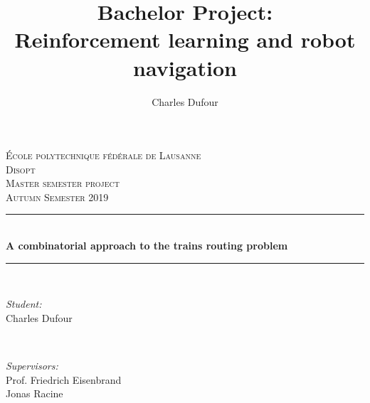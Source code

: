 \documentclass[14pt,a4paper]{article}
\author{Charles Dufour}
\title{Bachelor Project: \\
Reinforcement learning and robot navigation}
\theoremstyle{definition}
\numberwithin{equation}{subsection}
\begin{document}
\begin{titlepage}
\newcommand{\HRule}{\rule{\linewidth}{0.5mm}} %

\center %
 

\vspace{3cm}
\textsc{\LARGE \'Ecole polytechnique f\'ed\'erale de Lausanne}\\[0.5cm] %
\textsc{\large Disopt}\\[1.5cm] %
\textsc{\LARGE Master semester project}\\[0.5cm] %
\textsc{\large Autumn Semester 2019 }\\[0.5cm] %


\HRule \\[0.4cm]
{ \huge \bfseries A combinatorial approach to the trains routing problem}\\[0.4cm] %
\HRule \\[1.5cm]
 

\begin{minipage}{0.4\textwidth}
\begin{flushleft} \large
\emph{Student:}\\
Charles Dufour
\end{flushleft}
\end{minipage}
~
\begin{minipage}{0.4\textwidth}
\begin{flushright} \large
\emph{Supervisors:} \\
Prof. Friedrich Eisenbrand \\%
Jonas Racine
\end{flushright}
\end{minipage}\\[5cm]


\end{titlepage}
\end{document}
